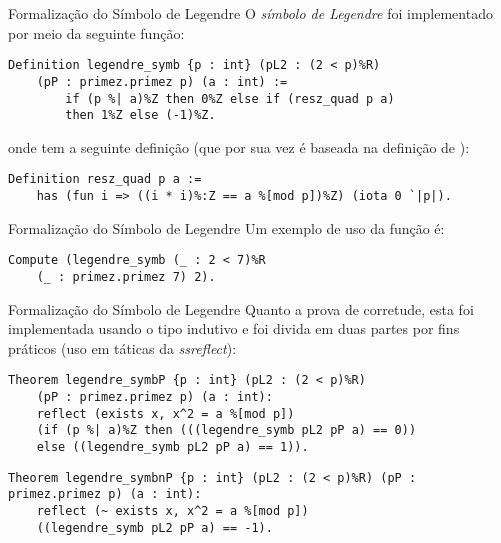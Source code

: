 \begin{frame}[fragile]{Formalização do Símbolo de Legendre}
    O \textit{símbolo de Legendre} foi implementado por meio da seguinte função:
        
        \begin{lstlisting}[language=coq,frame=single,tabsize=1]
Definition legendre_symb {p : int} (pL2 : (2 < p)%R) 
    (pP : primez.primez p) (a : int) :=
        if (p %| a)%Z then 0%Z else if (resz_quad p a)
        then 1%Z else (-1)%Z.
        \end{lstlisting}
        
        onde  tem a seguinte definição (que por sua vez é baseada na definição de ):
        
        \begin{lstlisting}[language=coq,frame=single,tabsize=1]
Definition resz_quad p a := 
    has (fun i => ((i * i)%:Z == a %[mod p])%Z) (iota 0 `|p|).
        \end{lstlisting}
    
\end{frame}

\begin{frame}[fragile]{Formalização do Símbolo de Legendre}
    Um exemplo de uso da função  é:
            \begin{lstlisting}[language=coq,frame=single,tabsize=1]
Compute (legendre_symb (_ : 2 < 7)%R 
    (_ : primez.primez 7) 2).
            \end{lstlisting}

\end{frame}

\begin{frame}[fragile]{Formalização do Símbolo de Legendre}
    Quanto a prova de corretude, esta foi implementada usando o tipo indutivo  e foi divida em duas partes por fins práticos (uso em táticas da \textit{ssreflect}):
    \newline
        \begin{lstlisting}[language=coq,frame=single,tabsize=1, escapechar=@]
Theorem legendre_symbP {p : int} (pL2 : (2 < p)%R) 
    (pP : primez.primez p) (a : int):
    reflect (exists x, x^2 = a %[mod p]) 
    (if (p %| a)%Z then (((legendre_symb pL2 pP a) == 0)) 
    else ((legendre_symb pL2 pP a) == 1)).
        \end{lstlisting}
            
        \begin{lstlisting}[language=coq,frame=single,tabsize=1, escapechar=@]
Theorem legendre_symbnP {p : int} (pL2 : (2 < p)%R) (pP : primez.primez p) (a : int):
    reflect (~ exists x, x^2 = a %[mod p]) 
    ((legendre_symb pL2 pP a) == -1).
        \end{lstlisting}
\end{frame}

